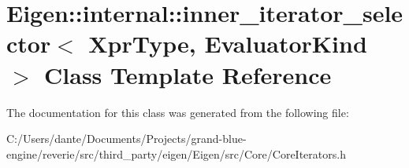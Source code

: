 \hypertarget{class_eigen_1_1internal_1_1inner__iterator__selector}{}\section{Eigen\+::internal\+::inner\+\_\+iterator\+\_\+selector$<$ Xpr\+Type, Evaluator\+Kind $>$ Class Template Reference}
\label{class_eigen_1_1internal_1_1inner__iterator__selector}


The documentation for this class was generated from the following file\+:\begin{DoxyCompactItemize}
\item 
C\+:/\+Users/dante/\+Documents/\+Projects/grand-\/blue-\/engine/reverie/src/third\+\_\+party/eigen/\+Eigen/src/\+Core/Core\+Iterators.\+h\end{DoxyCompactItemize}
